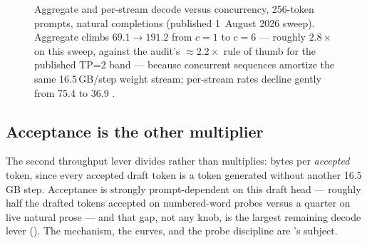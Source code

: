 \begin{figure}[htbp]
\centering
{}
\caption{Aggregate and per-stream decode \tokspersec{} versus concurrency, 256-token
prompts, natural completions (published 1~August 2026 sweep). Aggregate climbs
$69.1 \to 191.2$ \tokspersec{} from $c=1$ to $c=6$ --- roughly $2.8\times$ on this
sweep, against the audit's $\approx$$2.2\times$ rule of thumb for the published
TP=2 band --- because concurrent sequences amortize the same 16.5\,GB/step
weight stream; per-stream rates decline gently from 75.4 to 36.9 \tokspersec{}.}
\label{fig:perf-concurrency}
\end{figure}

\subsection{Acceptance is the other multiplier}

The second throughput lever divides rather than multiplies: bytes per
\emph{accepted} token, since every accepted draft token is a token generated
without another 16.5\,GB step. Acceptance is strongly prompt-dependent on
this draft head --- roughly half the drafted tokens accepted on
numbered-word probes versus a quarter on live natural prose --- and that gap,
not any  knob, is the largest remaining decode lever
(). The mechanism, the curves, and the probe
discipline are 's subject.

